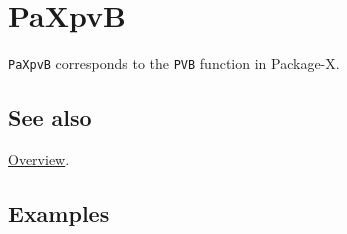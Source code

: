 \documentclass[../FeynHelpersManual.tex]{subfiles}
\begin{document}
\hypertarget{paxpvb}{
\section{PaXpvB}\label{paxpvb}}

\texttt{PaXpvB} corresponds to the \texttt{PVB} function in Package-X.

\subsection{See also}

\hyperlink{toc}{Overview}.

\subsection{Examples}
\end{document}

